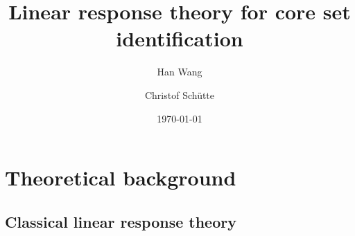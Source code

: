 \documentclass[aip,jcp,a4paper,reprint,onecolumn]{revtex4-1}
\begin{document}
\title{Linear response theory for core set identification}
\author{Han Wang}
\author{Christof Sch\"utte}

\date{\today}

\begin{abstract}
\end{abstract}

\maketitle

\section{Theoretical background}
\subsection{Classical linear response theory}
\end{document}
